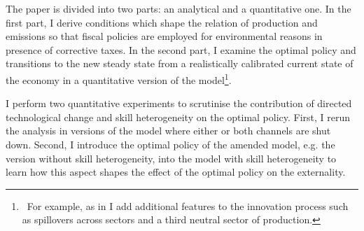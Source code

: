 The paper is divided into two parts: an analytical and a quantitative one.
In the first part, I derive  conditions which shape the relation of production and emissions so that fiscal policies are employed for environmental reasons in presence  of corrective taxes.  
In the second part, I examine the optimal policy and transitions to the new steady state from a realistically calibrated current state of the economy in a quantitative version of the model\footnote{\ For example, as in  \cite{Fried2018ClimateAnalysis} I add additional features to the innovation process such as spillovers across sectors and a third neutral sector of production.}.


I perform two quantitative experiments to scrutinise the contribution of directed technological change and skill heterogeneity on the optimal policy. First, I rerun the analysis in versions of the model where either or both channels are shut down.  Second, I introduce the optimal policy of the amended model, e.g. the  version without skill heterogeneity, into the model with skill heterogeneity to learn how this aspect shapes the effect of the optimal policy on the externality. %


